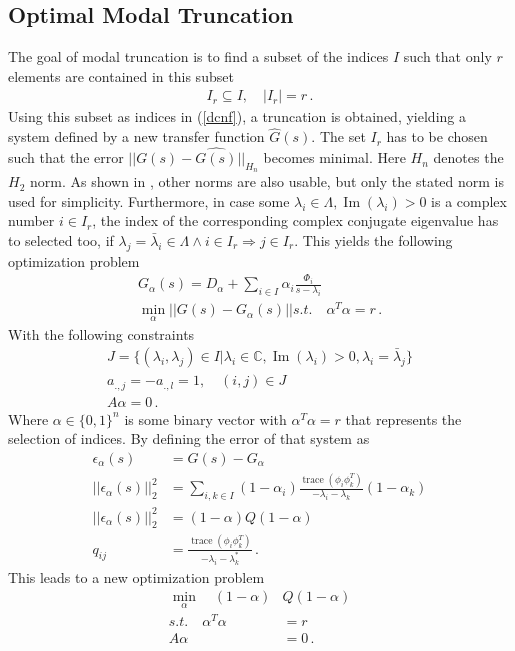 \subsection{Optimal Modal Truncation}
The goal of modal truncation is to find a subset of the indices \(I\)  such that only \(r\) elements are contained in this subset
\begin{gather}
I_r \subseteq I, \quad |I_r| = r \,.
\end{gather}
Using this subset as indices in (\ref{dcnf}), a truncation is obtained, yielding a system defined by a new transfer function \(\hat{G}(s)\).
The set \(I_r\) has to be chosen such that the error \(||G(s) - \hat{G(s)}||_{H_n}\) becomes minimal.
Here  \(H_n\) denotes the \(H_2\)  norm.
As shown in \cite{vuillemin2020optimal}, other norms are also usable, but only the stated norm is used for simplicity.
Furthermore, in case some \(\lambda_i \in \Lambda, \operatorname{Im}(\lambda_i) > 0\) is a complex number  \(i \in I_r\), the index of the corresponding complex conjugate eigenvalue has to selected too, if \(\lambda_j = \bar{\lambda}_i \in \Lambda \wedge i \in I_r \Rightarrow j \in I_r\). 
This yields the following optimization problem
\begin{gather}
G_{\alpha}(s) = D_{\alpha} + \sum_{i \in I} \alpha_i \frac{\Phi_i}{s - \lambda_i} \\ 
\min_{\alpha} ||G(s) - G_{\alpha}(s)|| s.t. \quad
\alpha^{T}\alpha = r \,.
\end{gather}
With the following constraints
\begin{gather}
J = \{(\lambda_i, \lambda_j) \in I | \lambda_i \in \mathbb{C}, \operatorname{Im}(\lambda_i) > 0, \lambda_i = \bar{\lambda}_j\} \\
a_{.,j} = -a_{.,l} = 1, \quad	(i, j) \in J \\
A\alpha = 0 \,.
\end{gather}
Where \(\alpha \in \{0, 1\}^{n}\) is some binary vector with \(\alpha^{T} \alpha = r\) that represents the selection of indices.
By defining the error of that system as
\begin{align}
\epsilon_{\alpha}(s) &= G(s) - G_{\alpha} \\
||\epsilon_{\alpha}(s)||_2^2 &= \sum_{i, k \in I} (1-\alpha_i) \frac{\operatorname{trace}(\phi_i \phi_k^{T})}{-\lambda_i - \lambda_k}(1-\alpha_k) \\
||\epsilon_{\alpha}(s)||_2^2 &= (1-\alpha)Q(1-\alpha) \\
q_{ij} &= \frac{\operatorname{trace}(\phi_i \phi_k^{T})}{-\lambda_i - \lambda_k^*} \,.
\end{align} 
This leads to a new optimization problem \cite{vuillemin2020optimal}
\begin{align}
\min_{\alpha} \quad (1-\alpha)&Q(1-\alpha) \label{opt-h2}\\
s.t. \quad \alpha^T\alpha &= r \\
A\alpha &= 0 \,.
\end{align}

